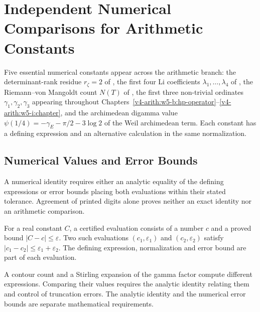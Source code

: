 \chapter{Independent Numerical Comparisons for Arithmetic Constants}
\label{v4-arith:w6-h:numerical-comparisons}

Five essential numerical constants appear across the arithmetic
branch: the determinant-rank residue \(r_{\zeta}=2\) of
, the first four Li coefficients
\(\lambda_{1},\dots,\lambda_{4}\) of
, the Riemann--von Mangoldt
count \(N(T)\) of , the first three
non-trivial ordinates \(\gamma_{1},\gamma_{2},\gamma_{3}\) appearing
throughout
Chapters~\ref{v4-arith:w5-b:hp-operator}--\ref{v4-arith:w5-i:chapter},
and the archimedean digamma value
\(\psi(1/4)=-\gamma_{E}-\pi/2-3\log 2\) of the Weil archimedean term.
Each constant has a defining expression and an alternative
calculation in the same normalization.

\section{Numerical Values and Error Bounds}
\label{v4-arith:w6-h:criterion}

A numerical identity requires either an analytic equality of the
defining expressions or error bounds placing both evaluations within
their stated tolerance. Agreement of printed digits alone proves
neither an exact identity nor an arithmetic comparison.

\begin{definition}
\label{v4-arith:w6-h:def:source-disjoint-cv}
For a real constant \(C\), a certified evaluation consists of a number
\(c\) and a proved bound \(|C-c|\leq\varepsilon\).
Two such evaluations \((c_1,\varepsilon_1)\) and
\((c_2,\varepsilon_2)\) satisfy
\(|c_1-c_2|\leq\varepsilon_1+\varepsilon_2\).
The defining expression, normalization and error bound are part of
each evaluation.
\end{definition}

\begin{remark}
\label{v4-arith:w6-h:rem:mechanical-semantic}
A contour count and a Stirling expansion of the gamma factor compute
different expressions. Comparing their values requires the analytic
identity relating them and control of truncation errors. The analytic identity and the numerical error bounds are separate
mathematical requirements.
\end{remark}

